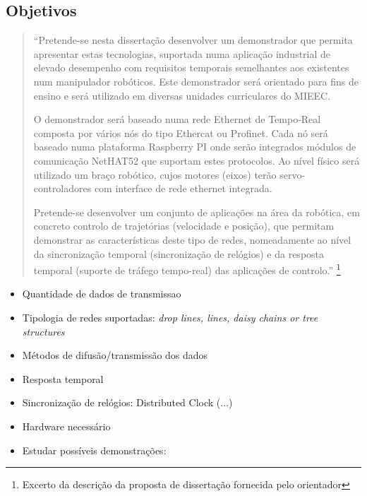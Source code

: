 \subsection{Objetivos}\label{sec:objetivos}
\begin{quote}
 ``Pretende-se nesta dissertação desenvolver um demonstrador que permita apresentar estas tecnologias, suportada numa aplicação industrial de elevado desempenho com requisitos temporais 
 semelhantes aos existentes num manipulador robóticos. Este demonstrador será orientado para fins de ensino e será utilizado em diversas unidades curriculares do MIEEC.

O demonstrador será baseado numa rede Ethernet de Tempo-Real composta por vários nós do tipo Ethercat ou Profinet. Cada nó será baseado numa plataforma Raspberry PI 
onde serão integrados módulos de comunicação NetHAT52 que suportam estes protocolos. Ao nível físico será utilizado um braço robótico, cujos motores (eixos) terão servo-controladores com interface de rede ethernet integrada.

Pretende-se desenvolver um conjunto de aplicações na área da robótica, em concreto controlo de trajetórias (velocidade e posição), que permitam demonstrar as características deste tipo de redes, 
nomeadamente ao nível da sincronização temporal (sincronização de relógios) e da resposta temporal (suporte de tráfego tempo-real) das aplicações de controlo.''
\footnote{Excerto da descrição da proposta de dissertação fornecida pelo orientador}
\end{quote}


\begin{itemize}
\item Quantidade de dados de transmissao
\item Tipologia de redes suportadas:
    \subitem \textit{drop lines, lines, daisy chains or tree structures}
\item Métodos de difusão/transmissão dos dados
\item Resposta temporal
\item Sincronização de relógios:
    \subitem Distributed Clock
    \subitem (...)
\item Hardware necessário
\item Estudar possíveis demonstrações:
\end{itemize}
